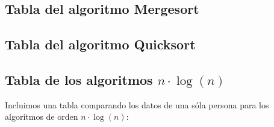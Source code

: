 \documentclass[a4paper, 11pt]{article}
\begin{document}
\subsection{Tabla del algoritmo Mergesort}

\subsection{Tabla del algoritmo Quicksort}


\newpage
\subsection{Tabla de los algoritmos $n\cdot \log(n)$}

\noindent Incluimos una tabla comparando los datos de una sóla persona para los algoritmos de orden $n\cdot \log(n)$: \\
\end{document}
